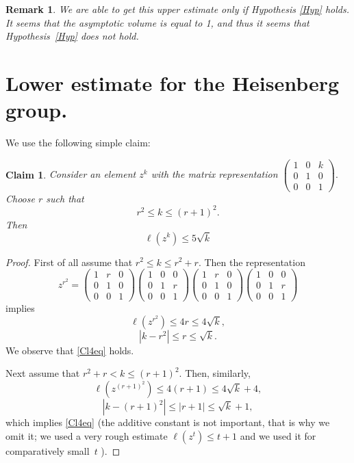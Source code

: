 \documentclass[11pt]{article}
\newcounter{razdel}[section]
\theoremstyle{Mystyle}
\newtheorem{Claim}[razdel]{Claim}
\newtheorem{Remark}[razdel]{Remark}
\begin{document}
\begin{Remark}
We are able to get this upper estimate only if Hypothesis \ref{Hyp} holds.
It seems that the asymptotic volume is equal to 1, and thus it seems that Hypothesis~\ref{Hyp} does not hold.
\end{Remark}

\section{Lower estimate for the Heisenberg group.}

We use the following simple claim:

\begin{Claim}
\label{Cl4}
Consider an element $z^{k}$ with the matrix representation
$
\left(\begin{array}{ccc} 1& 0 & k\\ 0 & 1 & 0\\ 0 & 0 & 1 \end{array}\right).
$
Choose $r$ such that $$r^2\leq k\leq (r+1)^2.$$
Then 
\begin{equation}
\label{Cl4eq}
\ell(z^k)\leq 5\sqrt{k}
\end{equation}
\end{Claim}
\begin{proof}
First of all assume that $r^2\leq k\leq r^2 + r$.
Then the representation
$$
z^{r^2}=
\left(\begin{array}{ccc} 1& r & 0\\ 0 & 1 & 0\\ 0 & 0 & 1 \end{array}\right)
\left(\begin{array}{ccc} 1& 0 & 0\\ 0 & 1 & r\\ 0 & 0 & 1 \end{array}\right)
\left(\begin{array}{ccc} 1& r & 0\\ 0 & 1 & 0\\ 0 & 0 & 1 \end{array}\right)
\left(\begin{array}{ccc} 1& 0 & 0\\ 0 & 1 & r\\ 0 & 0 & 1 \end{array}\right)
$$
implies
$$\ell(z^{r^2})\leq 4r\leq 4\sqrt{k},$$
$$|k - r^2|\leq r\leq \sqrt{k}.$$
We observe that \eqref{Cl4eq} holds.

Next assume that $r^2+r<k\leq (r+1)^2$.
Then, similarly,
$$\ell(z^{(r+1)^2})\leq 4(r+1)\leq 4\sqrt{k}+4,$$
$$|k-(r+1)^2|\leq |r+1|\leq\sqrt{k}+1,$$
which implies \eqref{Cl4eq}
(the additive constant is not important, that is why we omit it;
we used a very rough estimate $\ell(z^t)\leq t+1$ and we used it for comparatively small~$t$%
).
\end{proof}
\end{document}
